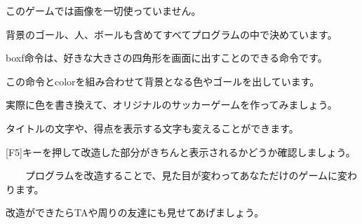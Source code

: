 このゲームでは画像を一切使っていません。

背景のゴール、人、ボールも含めてすべてプログラムの中で決めています。

boxf命令は、好きな大きさの四角形を画面に出すことのできる命令です。

この命令とcolorを組み合わせて背景となる色やゴールを出しています。



実際に色を書き換えて、オリジナルのサッカーゲームを作ってみましょう。

タイトルの文字や、得点を表示する文字も変えることができます。




\begin{description}
    \item {}
\end{description}


[F5]キーを押して改造した部分がきちんと表示されるかどうか確認しましょう。

\ \ \ \ プログラムを改造することで、見た目が変わってあなただけのゲームに変わります。

改造ができたらTAや周りの友達にも見せてあげましょう。